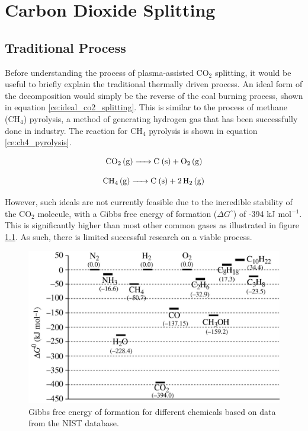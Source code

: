 \chapter{Carbon Dioxide Splitting}

\section{Traditional Process}

Before understanding the process of plasma-assisted CO$_2$ splitting, it would be useful to briefly explain the traditional thermally driven process. An ideal form of the decomposition would simply be the reverse of the coal burning process, shown in equation \ref{ce:ideal_co2_splitting}. This is similar to the process of methane (CH$_4$) pyrolysis, a method of generating hydrogen gas that has been successfully done in industry. The reaction for CH$_4$ pyrolysis is shown in equation \ref{ce:ch4_pyrolysis}.

\begin{equation}
    \ce{CO_2 (g) -> C (s) + O_2 (g)}
    \label{ce:ideal_co2_splitting}
\end{equation}

\begin{equation}
    \ce{CH_4 (g) -> C (s) + 2H_2 (g)}
    \label{ce:ch4_pyrolysis}
\end{equation}

However, such ideals are not currently feasible due to the incredible stability of the CO$_2$ molecule, with a Gibbs free energy of formation ($\Delta G^\circ$) of -394 kJ mol$^{-1}$. This is significantly higher than most other common gases as illustrated in figure \ref{fig:co2_stability}. As such, there is limited successful research on a viable process.

\begin{figure}[h!]
	\centering
	\includegraphics[width=0.8\linewidth]{chapter_3/figures/co2_stability.jpg}
	\caption{Gibbs free energy of formation for different chemicals based on data from the NIST database. \cite{jiang_xiao_kuznetsov_edwards_2010}}
	\label{fig:co2_stability}
\end{figure} 

